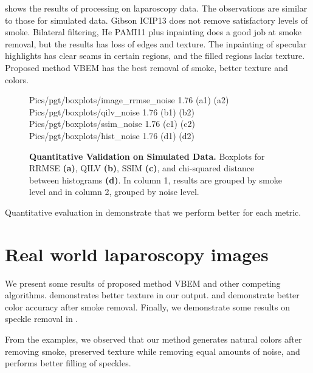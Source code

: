  shows the results of processing on laparoscopy data. The observations are similar to those for simulated data. Gibson ICIP13 does not remove satisfactory levels of smoke. Bilateral filtering, He PAMI11 \cite{he2011dark} plus inpainting does a good job at smoke removal, but the results has loss of edges and texture. The inpainting of specular highlights has clear seams in certain regions, and the filled regions lacks texture. Proposed method VBEM has the best removal of smoke, better texture and colors.

\begin{figure}[!h]
     {Pics/pgt/boxplots/image_rrmse_noise} {1.76} {(a1)} {(a2)}
     {Pics/pgt/boxplots/qilv_noise} {1.76} {(b1)} {(b2)}
     {Pics/pgt/boxplots/ssim_noise} {1.76} {(c1)} {(c2)}
     {Pics/pgt/boxplots/hist_noise} {1.76} {(d1)} {(d2)}
    \caption
    {
        {\bf Quantitative Validation on Simulated Data.}
        Boxplots for RRMSE \textbf{(a)}, QILV \textbf{(b)}, SSIM \textbf{(c)}, and chi-squared distance between histograms \textbf{(d)}.
        In column 1, results are grouped by smoke level and in column 2, grouped by noise level.
    }
    \label{fig:resultsPgtSimulated}
\end{figure}

Quantitative evaluation in  demonstrate that we perform better for each metric.

\section{Real world laparoscopy images}
We present some results of proposed method VBEM and other competing algorithms.  demonstrates better texture in our output.  and  demonstrate better color accuracy after smoke removal. Finally, we demonstrate some results on speckle removal in .

From the examples, we observed that our method generates natural colors after removing smoke, preserved texture while removing equal amounts of noise, and performs better filling of speckles.

